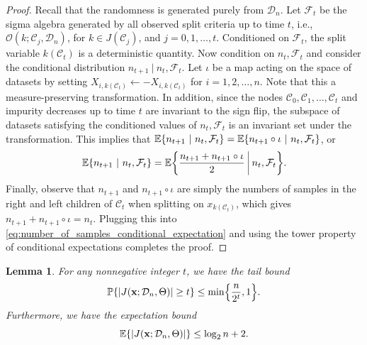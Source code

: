 \documentclass[11pt]{article}
\newtheorem{lemma}[theorem]{Lemma}
\newcommand{\bx}{\mathbf{x}}
\DeclarePairedDelimiter{\braces}{\lbrace}{\rbrace}
\DeclarePairedDelimiter{\abs}{|}{|}
\renewcommand{\P}{\mathbb{P}}
\newcommand{\E}{\mathbb{E}}
\newcommand{\cell}{\mathcal{C}}
\newcommand{\nsamples}{n}
\newcommand{\data}[1][n]{\mathcal{D}_{#1}}
\newcommand{\cellfeatindices}{J}
\begin{document}
\begin{proof}
    Recall that the randomness is generated purely from $\data$.
    Let $\mathcal{F}_t$ be the sigma algebra generated by all observed split criteria up to time $t$, i.e., $\mathcal{O}(k;\cell_j,\data)$, for $k \in \cellfeatindices(\cell_j)$, and $j=0,1,\ldots,t$.
    Conditioned on $\mathcal{F}_t$, the split variable $k(\cell_t)$ is a deterministic quantity.
    Now 
    condition on $n_t,\mathcal{F}_t$ and consider the conditional distribution
    $n_{t+1}~|~n_t,\mathcal{F}_t$.
    Let $\iota$ be a map acting on the space of datasets by setting $X_{i,k(\cell_t)} \gets -X_{i,k(\cell_t)}$ for $i=1,2,\ldots,\nsamples$.
    Note that this a measure-preserving transformation.
    In addition, since the nodes $\cell_0,\cell_1,\ldots,\cell_t$ and impurity decreases up to time $t$ are invariant to the sign flip, the subspace of datasets satisfying the conditioned values of $n_t,\mathcal{F}_t$ is an invariant set under the transformation.
    This implies that $\E\braces*{n_{t+1}~|~n_t,\mathcal{F}_t} = \E\braces*{n_{t+1}\circ\iota~|~n_{t},\mathcal{F}_t}$, or
    \begin{equation} \label{eq:number_of_samples_conditional_expectation}
        \E\braces*{n_{t+1}~|~n_{t},\mathcal{F}_t} = \E\braces*{\frac{n_{t+1} + n_{t+1}\circ\iota}{2}~\vline~n_{t},\mathcal{F}_t}.
    \end{equation}
    Finally, observe that $n_{t+1}$ and $n_{t+1}\circ\iota$ are simply the numbers of samples in the right and left children of $\cell_t$ when splitting on $x_{k(\cell_t)}$, which gives $n_{t+1} + n_{t+1}\circ \iota = n_{t}$.
    Plugging this into \eqref{eq:number_of_samples_conditional_expectation} and using the tower property of conditional expectations completes the proof.
\end{proof}

\begin{lemma}
    \label{lem:bound_for_tree_depth}
    For any nonnegative integer $t$, we have the tail bound
    \begin{equation}
    \label{eq:tree_depth_probability}
        \P\braces*{\abs*{J(\bx;\data,\Theta)} \geq t} \leq \min\braces*{\frac{n}{2^{t}},1}.
    \end{equation}
    Furthermore, we have the expectation bound
    \begin{equation}
    \label{eq:tree_depth_expectation}
        \E\braces*{\abs*{J(\bx;\data,\Theta)}} \leq \log_2 \nsamples + 2.
    \end{equation}
\end{lemma}
\end{document}

